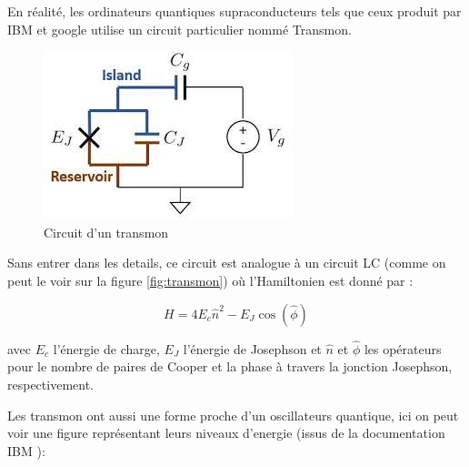 \documentclass{article}
\begin{document}
\begin{multicols}{2}
En réalité, les ordinateurs quantiques supraconducteurs tels que ceux produit par IBM et google utilise un circuit particulier nommé Transmon.
\begin{figure}[H]
    \centering
    \includegraphics[width = \columnwidth]{fig/transmon_circuit.jpg}
    \caption{Circuit d'un transmon}
    \label{fig:transmon}
\end{figure}

Sans entrer dans les details, ce circuit est analogue à un circuit LC (comme on peut le voir sur la figure \autoref{fig:transmon}) où l'Hamiltonien est donné par :

$$
H = 4E_c\hat{n}^2 - E_J\cos(\hat{\phi})
$$

avec $E_c$ l'énergie de charge, $E_J$ l'énergie de Josephson et $\hat{n}$ et $\hat{\phi}$ les opérateurs pour le nombre de paires de Cooper et la phase à travers la jonction Josephson, respectivement.

Les transmon ont aussi une forme proche d'un oscillateurs quantique, ici on peut voir une figure représentant leurs niveaux d'energie (issus de la documentation IBM \cite{noauthor_introduction_nodate}):


\end{multicols}
\end{document}
